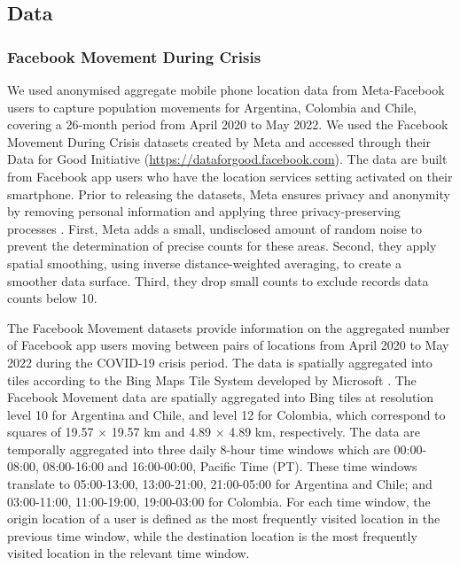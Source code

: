 \documentclass[fleqn,10pt]{wlscirep}
\begin{document}
\subsection*{Data}

\subsubsection*{Facebook Movement During Crisis}

We used anonymised aggregate mobile phone location data from Meta-Facebook users to capture population movements for Argentina, Colombia and Chile, covering a 26-month period from April 2020 to May 2022. We used the Facebook Movement During Crisis datasets created by Meta and accessed through their Data for Good Initiative (\href{https://dataforgood.facebook.com}{https://dataforgood.facebook.com}). The data are built from Facebook app users who have the location services setting activated on their smartphone. Prior to releasing the datasets, Meta ensures privacy and anonymity by removing personal information and applying three privacy-preserving processes \cite{Maas19}. First, Meta adds a small, undisclosed amount of random noise to prevent the determination of precise counts for these areas.
Second, they apply spatial smoothing, using inverse distance-weighted averaging, to create a smoother data surface. Third, they drop small counts to exclude records data counts below 10.

The Facebook Movement datasets provide information on the aggregated number of Facebook app users moving between pairs of locations from April 2020 to May 2022 during the COVID-19 crisis period. The data is spatially aggregated into tiles according to the Bing Maps Tile System developed by Microsoft \cite{MicrosoftBingMaps}. The Facebook Movement data are spatially aggregated into Bing tiles at resolution level 10 for Argentina and Chile, and level 12 for Colombia, which correspond to squares of 19.57 $\times$ 19.57 km and 4.89 $\times$ 4.89 km, respectively. The data are temporally aggregated into three daily 8-hour time windows which are 00:00-08:00, 08:00-16:00 and 16:00-00:00, Pacific Time (PT).
These time windows translate to 05:00-13:00, 13:00-21:00, 21:00-05:00 for Argentina and Chile; and 03:00-11:00, 11:00-19:00, 19:00-03:00 for Colombia. For each time window, the origin location of a user is defined as the most frequently visited location in the previous time window, while the destination location is the most frequently visited location in the relevant time window.
\end{document}
